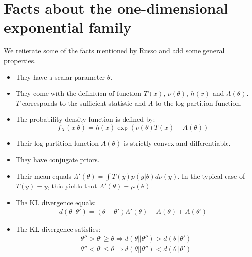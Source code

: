 \section{Facts about the one-dimensional exponential family}
We reiterate some of the facts mentioned by Russo and add some general properties.
\begin{itemize}
  \item They have a scalar parameter $\theta$.
  \item They come with the definition of function $T(x)$, $\nu(\theta)$, $h(x)$ and $A(\theta)$. $T$ corresponds to the sufficient statistic and $A$ to the log-partition function.
  \item The probability density function is defined by:
    \[f_X(x|\theta) = h(x) \exp(\nu(\theta) T(x) - A(\theta))\]
  \item Their log-partition-function $A(\theta)$ is strictly convex and differentiable.
  \item They have conjugate priors.
  \item Their mean equals $A'(\theta) = \int T(y)p(y|\theta)d\nu(y)$. In the typical case of $T(y)=y$, this yields that $A'(\theta) = \mu(\theta)$.
  \item The KL divergence equals:
    \begin{align}
        d(\theta||\theta') = (\theta - \theta')A'(\theta) - A(\theta) + A(\theta')\label{eq:exponential_kl}
    \end{align}
  \item The KL divergence satisfies:
    \begin{align}
      &\theta'' > \theta' \geq \theta \Rightarrow d(\theta||\theta'') > d(\theta||\theta') \label{eq:kl_monotonicity}\\
      &\theta'' < \theta' \leq \theta \Rightarrow d(\theta||\theta'') < d(\theta||\theta')
    \end{align}
\end{itemize}


